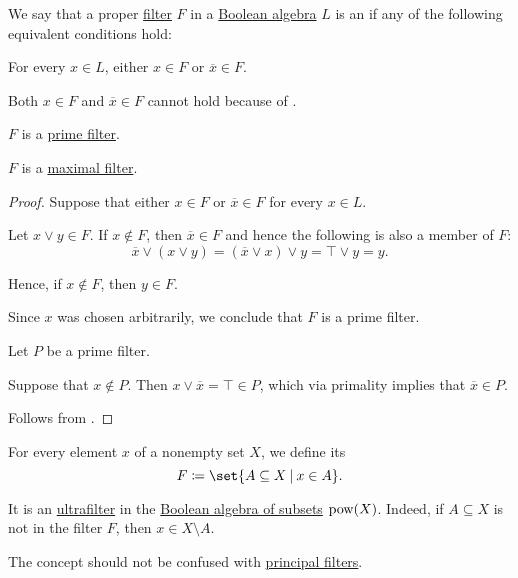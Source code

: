 \begin{definition}\label{def:ultrafilter}\mimprovised
  We say that a proper \hyperref[def:lattice_ideal/ideal]{filter} \( F \) in a \hyperref[def:boolean_algebra]{Boolean algebra} \( L \) is an  if any of the following equivalent conditions hold:
  \begin{thmenum}
     For every \( x \in L \), either \( x \in F \) or \( \overline x \in F \).

    Both \( x \in F \) and \( \overline x \in F \) cannot hold because of .

     \( F \) is a \hyperref[def:lattice_ideal/prime]{prime filter}.

     \( F \) is a \hyperref[def:lattice_ideal/maximal]{maximal filter}.
  \end{thmenum}
\end{definition}
\begin{proof}
   Suppose that either \( x \in F \) or \( \overline x \in F \) for every \( x \in L \).

  Let \( x \vee y \in F \). If \( x \not\in F \), then \( \overline x \in F \) and hence the following is also a member of \( F \):
  \begin{equation*}
    \overline x \vee (x \vee y)
    =
    (\overline x \vee x) \vee y
    =
    \top \vee y
    =
    y.
  \end{equation*}

  Hence, if \( x \not\in F \), then \( y \in F \).

  Since \( x \) was chosen arbitrarily, we conclude that \( F \) is a prime filter.

   Let \( P \) be a prime filter.

  Suppose that \( x \not\in P \). Then \( x \vee \overline x = \top \in P \), which via primality implies that \( \overline x \in P \).

   Follows from .
\end{proof}

\begin{example}\label{ex:principal_ultrafilter}
  For every element \( x \) of a nonempty set \( X \), we define its 
  \begin{equation*}
    F \coloneqq \set{ A \subseteq X \given x \in A }.
  \end{equation*}

  It is an \hyperref[def:ultrafilter]{ultrafilter} in the \hyperref[thm:boolean_algebra_of_subsets]{Boolean algebra of subsets} \( \operatorname{pow}(X) \). Indeed, if \( A \subseteq X \) is not in the filter \( F \), then \( x \in X \setminus A \).

  The concept should not be confused with \hyperref[def:lattice_ideal/principal]{principal filters}.
\end{example}

